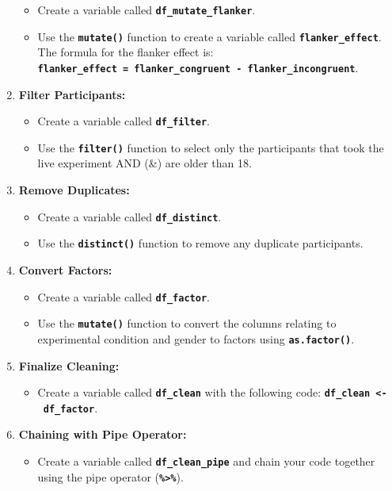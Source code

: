 \documentclass[
]{book}
\providecommand{\tightlist}{%
  \setlength{\itemsep}{0pt}\setlength{\parskip}{0pt}}
\begin{document}
\begin{enumerate}
  \begin{itemize}
  \item
    Create a variable called \textbf{\texttt{df\_mutate\_flanker}}.
  \item
    Use the \textbf{\texttt{mutate()}} function to create a variable called \textbf{\texttt{flanker\_effect}}. The formula for the flanker effect is: \textbf{\texttt{flanker\_effect\ =\ flanker\_congruent\ -\ flanker\_incongruent}}.
  \end{itemize}
\item
  \textbf{Filter Participants:}

  \begin{itemize}
  \item
    Create a variable called \textbf{\texttt{df\_filter}}.
  \item
    Use the \textbf{\texttt{filter()}} function to select only the participants that took the live experiment AND (\&) are older than 18.
  \end{itemize}
\item
  \textbf{Remove Duplicates:}

  \begin{itemize}
  \item
    Create a variable called \textbf{\texttt{df\_distinct}}.
  \item
    Use the \textbf{\texttt{distinct()}} function to remove any duplicate participants.
  \end{itemize}
\item
  \textbf{Convert Factors:}

  \begin{itemize}
  \item
    Create a variable called \textbf{\texttt{df\_factor}}.
  \item
    Use the \textbf{\texttt{mutate()}} function to convert the columns relating to experimental condition and gender to factors using \textbf{\texttt{as.factor()}}.
  \end{itemize}
\item
  \textbf{Finalize Cleaning:}

  \begin{itemize}
  \tightlist
  \item
    Create a variable called \textbf{\texttt{df\_clean}} with the following code: \textbf{\texttt{df\_clean\ \textless{}-\ df\_factor}}.
  \end{itemize}
\item
  \textbf{Chaining with Pipe Operator:}

  \begin{itemize}
  \tightlist
  \item
    Create a variable called \textbf{\texttt{df\_clean\_pipe}} and chain your code together using the pipe operator (\textbf{\texttt{\%\textgreater{}\%}}).
  \end{itemize}
\end{enumerate}
\end{document}
